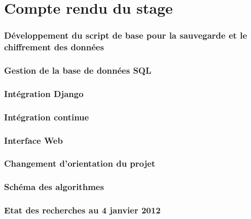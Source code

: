 \part{Compte rendu du stage}

\section{Développement du script de base pour la sauvegarde et le chiffrement des données}



\section{Gestion de la base de données SQL}



\section{Intégration Django}



\section{Intégration continue}



\section{Interface Web}



\section{Changement d'orientation du projet}



\section{Schéma des algorithmes}



\section{Etat des recherches au 4 janvier 2012}


